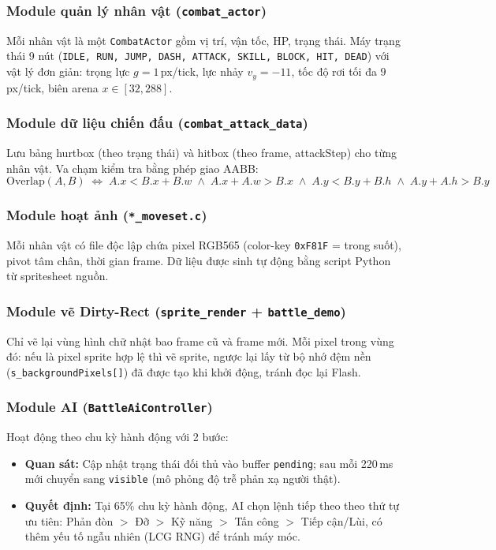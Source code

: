 \documentclass[a4paper,12pt]{report}
\begin{document}
\subsubsection{Module quản lý nhân vật (\texttt{combat\_actor})}
Mỗi nhân vật là một \texttt{CombatActor} gồm vị trí, vận tốc, HP, trạng thái. Máy trạng thái 9 nút (\texttt{IDLE, RUN, JUMP, DASH, ATTACK, SKILL, BLOCK, HIT, DEAD}) với vật lý đơn giản: trọng lực $g=1$\,px/tick, lực nhảy $v_y=-11$, tốc độ rơi tối đa $9$\,px/tick, biên arena $x\in[32,288]$.

\subsubsection{Module dữ liệu chiến đấu (\texttt{combat\_attack\_data})}
Lưu bảng hurtbox (theo trạng thái) và hitbox (theo frame, attackStep) cho từng nhân vật. Va chạm kiểm tra bằng phép giao AABB:
\[
\text{Overlap}(A,B) \;\Leftrightarrow\; A.x < B.x{+}B.w \;\wedge\; A.x{+}A.w > B.x \;\wedge\; A.y < B.y{+}B.h \;\wedge\; A.y{+}A.h > B.y
\]

\subsubsection{Module hoạt ảnh (\texttt{*\_moveset.c})}
Mỗi nhân vật có file độc lập chứa pixel RGB565 (color-key \texttt{0xF81F} = trong suốt), pivot tâm chân, thời gian frame. Dữ liệu được sinh tự động bằng script Python từ spritesheet nguồn.

\subsubsection{Module vẽ Dirty-Rect (\texttt{sprite\_render} + \texttt{battle\_demo})}
Chỉ vẽ lại vùng hình chữ nhật bao frame cũ và frame mới. Mỗi pixel trong vùng đó: nếu là pixel sprite hợp lệ thì vẽ sprite, ngược lại lấy từ bộ nhớ đệm nền (\texttt{s\_backgroundPixels[]}) đã được tạo khi khởi động, tránh đọc lại Flash.

\subsubsection{Module AI (\texttt{BattleAiController})}
Hoạt động theo chu kỳ hành động với 2 bước:
\begin{itemize}
    \item \textbf{Quan sát:} Cập nhật trạng thái đối thủ vào buffer \texttt{pending}; sau mỗi 220\,ms mới chuyển sang \texttt{visible} (mô phỏng độ trễ phản xạ người thật).
    \item \textbf{Quyết định:} Tại 65\% chu kỳ hành động, AI chọn lệnh tiếp theo theo thứ tự ưu tiên: Phản đòn $>$ Đỡ $>$ Kỹ năng $>$ Tấn công $>$ Tiếp cận/Lùi, có thêm yếu tố ngẫu nhiên (LCG RNG) để tránh máy móc.
\end{itemize}
\end{document}

